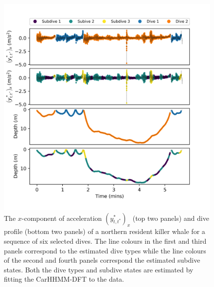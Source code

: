 \begin{figure}[ht]
	\centering
	\includegraphics[width=5in]{../Plots/CarHHMM2_decoded_dives.png}
	\caption{The $x$-component of acceleration $\left(y^*_{t,t^*}\right)_x$ (top two panels) and dive profile (bottom two panels) of a northern resident killer whale for a sequence of six selected dives. The line colours in the first and third panels correspond to the estimated dive types while the line colours of the second and fourth panels correspond the estimated subdive states. Both the dive types and subdive states are estimated by fitting the CarHHMM-DFT to the data.}
	\label{fig:labeled_dives}
\end{figure}


